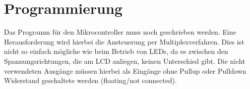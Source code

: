 \section{Programmierung}

Das Programm für den Mikrocontroller muss noch geschrieben werden. Eine Herausforderung wird hierbei die Ansteuerung per Multiplexverfahren. Dies ist nicht so einfach mögliche wie beim Betrieb von LEDs, da es zwischen den Spannungsrichtungen, die am LCD anliegen, keinen Unterschied gibt. Die nicht verwendeten Ausgänge müssen hierbei als Eingänge ohne Pullup oder Pulldown Widerstand geschaltete werden (floating/not connected).